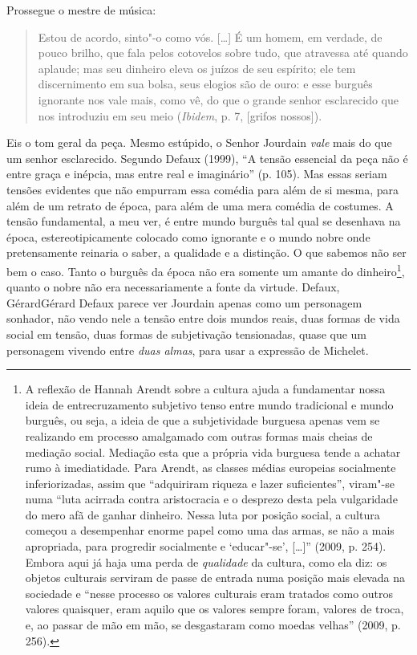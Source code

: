 Prossegue o mestre de música:

\begin{quote}
Estou de acordo, sinto"-o como vós. [\ldots{}] É um homem, em
verdade, de pouco brilho, que fala pelos cotovelos sobre tudo, que
atravessa até quando aplaude; mas seu dinheiro eleva os juízos de seu
espírito; ele tem discernimento em sua bolsa, seus elogios são de ouro:
e esse burguês ignorante nos vale mais, como vê, do que o grande senhor
esclarecido que nos introduziu em seu meio (\emph{Ibidem}, p. 7, [grifos nossos]).
\end{quote}

Eis o tom geral da peça. Mesmo estúpido, o Senhor Jourdain \emph{vale}
mais do que um senhor esclarecido. Segundo Defaux (1999), ``A tensão
essencial da peça não é entre graça e inépcia, mas entre real e
imaginário'' (p. 105). Mas essas seriam tensões evidentes que não
empurram essa comédia para além de si mesma, para além de um retrato de
época, para além de uma mera comédia de costumes. A tensão fundamental,
a meu ver, é entre mundo burguês tal qual se desenhava na época,
estereotipicamente colocado como ignorante e o mundo nobre onde
pretensamente reinaria o saber, a qualidade e a distinção. O que sabemos
não ser bem o caso. Tanto o burguês da época não era somente um amante
do dinheiro\footnote{A reflexão de Hannah Arendt sobre a cultura ajuda a
  fundamentar nossa ideia de entrecruzamento subjetivo tenso entre mundo
  tradicional e mundo burguês, ou seja, a ideia de que a subjetividade
  burguesa apenas vem se realizando em processo amalgamado com outras
  formas mais cheias de mediação social. Mediação esta que a própria
  vida burguesa tende a achatar rumo à imediatidade. Para Arendt, as
  classes médias europeias socialmente inferiorizadas, assim que
  ``adquiriram riqueza e lazer suficientes'', viram"-se numa ``luta
  acirrada contra aristocracia e o desprezo desta pela vulgaridade do
  mero afã de ganhar dinheiro. Nessa luta por posição social, a cultura
  começou a desempenhar enorme papel como uma das armas, se não a mais
  apropriada, para progredir socialmente e `educar"-se',
  [\ldots{}]'' (2009, p. 254). Embora aqui já haja uma perda de
  \emph{qualidade} da cultura, como ela diz: os objetos culturais
  serviram de passe de entrada numa posição mais elevada na sociedade e
  ``nesse processo os valores culturais eram tratados como outros
  valores quaisquer, eram aquilo que os valores sempre foram, valores de
  troca, e, ao passar de mão em mão, se desgastaram como moedas
  velhas'' (2009, p. 256).}, quanto o nobre não era necessariamente a
fonte da virtude. Defaux, GérardGérard Defaux parece ver Jourdain apenas como um
personagem sonhador, não vendo nele a tensão entre dois mundos reais,
duas formas de vida social em tensão, duas formas de subjetivação
tensionadas, quase que um personagem vivendo entre \emph{duas almas},
para usar a expressão de Michelet.

